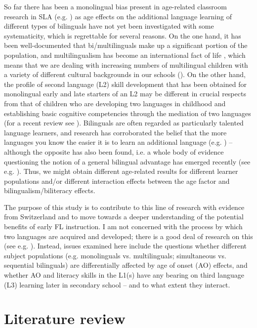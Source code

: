\documentclass[output=paper,modfonts,nonflat,newtxmath]{langsci/langscibook}
\begin{document}
So far there has been a monolingual bias present in age-related classroom research in SLA (e.g. \citealt{GarciaMayoGarciaLecumberri2003, Muñoz2006}) as age effects on the additional language learning of different types of bilinguals have not yet been investigated with some systematicity, which is regrettable for several reasons. On the one hand, it has been well-documented that bi/multilinguals make up a significant portion of the population, and multilingualism has become an international fact of life \citep{Grosjean2010}, which means that we are dealing with increasing numbers of multilingual children with a variety of different cultural backgrounds in our schools (\citealt{MeijerEtAl2003}). On the other hand, the profile of second language (L2) skill development that has been obtained for monolingual early and late starters of an L2 may be different in crucial respects from that of children who are developing two languages in childhood and establishing basic cognitive competencies through the mediation of two languages (for a recent review see \citealt{BialystokEtAl2016}). Bilinguals are often regarded as particularly talented language learners, and research has corroborated the belief that the more languages you know the easier it is to learn an additional language (e.g. \citealt{CenozValencia1994}) -- although the opposite has also been found, i.e. a whole body of evidence questioning the notion of a general bilingual advantage has emerged recently (see e.g. \citealt{deBot2017}). Thus, we might obtain different age-related results for different learner populations and/or different interaction effects between the age factor and bilingualism/biliteracy effects.

The purpose of this study is to contribute to this line of research with evidence from Switzerland and to move towards a deeper understanding of the potential benefits of early FL instruction. I am not concerned with the process by which two languages are acquired and developed; there is a good deal of research on this (see e.g. \citealt{AroninHufeisen2009}). Instead, issues examined here include the questions whether different subject populations (e.g. monolinguals vs. multilinguals; simultaneous vs. sequential bilinguals) are differentially affected by age of onset (AO) effects, and whether AO and literacy skills in the L1(s) have any bearing on third language (L3) learning later in secondary school – and to what extent they interact.

\section{Literature review}
\label{sec:pfenninger:2}
\end{document}
